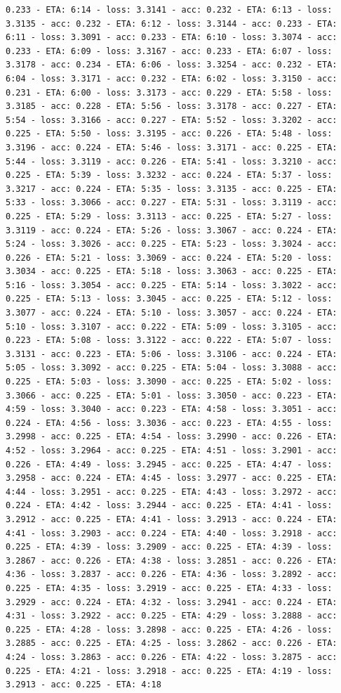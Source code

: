 \documentclass[11pt]{article}
\begin{document}
\begin{Verbatim}[commandchars=\\\{\}]
0.233 - ETA: 6:14 - loss: 3.3141 - acc: 0.232 - ETA: 6:13 - loss: 3.3135 - acc: 0.232 - ETA: 6:12 - loss: 3.3144 - acc: 0.233 - ETA: 6:11 - loss: 3.3091 - acc: 0.233 - ETA: 6:10 - loss: 3.3074 - acc: 0.233 - ETA: 6:09 - loss: 3.3167 - acc: 0.233 - ETA: 6:07 - loss: 3.3178 - acc: 0.234 - ETA: 6:06 - loss: 3.3254 - acc: 0.232 - ETA: 6:04 - loss: 3.3171 - acc: 0.232 - ETA: 6:02 - loss: 3.3150 - acc: 0.231 - ETA: 6:00 - loss: 3.3173 - acc: 0.229 - ETA: 5:58 - loss: 3.3185 - acc: 0.228 - ETA: 5:56 - loss: 3.3178 - acc: 0.227 - ETA: 5:54 - loss: 3.3166 - acc: 0.227 - ETA: 5:52 - loss: 3.3202 - acc: 0.225 - ETA: 5:50 - loss: 3.3195 - acc: 0.226 - ETA: 5:48 - loss: 3.3196 - acc: 0.224 - ETA: 5:46 - loss: 3.3171 - acc: 0.225 - ETA: 5:44 - loss: 3.3119 - acc: 0.226 - ETA: 5:41 - loss: 3.3210 - acc: 0.225 - ETA: 5:39 - loss: 3.3232 - acc: 0.224 - ETA: 5:37 - loss: 3.3217 - acc: 0.224 - ETA: 5:35 - loss: 3.3135 - acc: 0.225 - ETA: 5:33 - loss: 3.3066 - acc: 0.227 - ETA: 5:31 - loss: 3.3119 - acc: 0.225 - ETA: 5:29 - loss: 3.3113 - acc: 0.225 - ETA: 5:27 - loss: 3.3119 - acc: 0.224 - ETA: 5:26 - loss: 3.3067 - acc: 0.224 - ETA: 5:24 - loss: 3.3026 - acc: 0.225 - ETA: 5:23 - loss: 3.3024 - acc: 0.226 - ETA: 5:21 - loss: 3.3069 - acc: 0.224 - ETA: 5:20 - loss: 3.3034 - acc: 0.225 - ETA: 5:18 - loss: 3.3063 - acc: 0.225 - ETA: 5:16 - loss: 3.3054 - acc: 0.225 - ETA: 5:14 - loss: 3.3022 - acc: 0.225 - ETA: 5:13 - loss: 3.3045 - acc: 0.225 - ETA: 5:12 - loss: 3.3077 - acc: 0.224 - ETA: 5:10 - loss: 3.3057 - acc: 0.224 - ETA: 5:10 - loss: 3.3107 - acc: 0.222 - ETA: 5:09 - loss: 3.3105 - acc: 0.223 - ETA: 5:08 - loss: 3.3122 - acc: 0.222 - ETA: 5:07 - loss: 3.3131 - acc: 0.223 - ETA: 5:06 - loss: 3.3106 - acc: 0.224 - ETA: 5:05 - loss: 3.3092 - acc: 0.225 - ETA: 5:04 - loss: 3.3088 - acc: 0.225 - ETA: 5:03 - loss: 3.3090 - acc: 0.225 - ETA: 5:02 - loss: 3.3066 - acc: 0.225 - ETA: 5:01 - loss: 3.3050 - acc: 0.223 - ETA: 4:59 - loss: 3.3040 - acc: 0.223 - ETA: 4:58 - loss: 3.3051 - acc: 0.224 - ETA: 4:56 - loss: 3.3036 - acc: 0.223 - ETA: 4:55 - loss: 3.2998 - acc: 0.225 - ETA: 4:54 - loss: 3.2990 - acc: 0.226 - ETA: 4:52 - loss: 3.2964 - acc: 0.225 - ETA: 4:51 - loss: 3.2901 - acc: 0.226 - ETA: 4:49 - loss: 3.2945 - acc: 0.225 - ETA: 4:47 - loss: 3.2958 - acc: 0.224 - ETA: 4:45 - loss: 3.2977 - acc: 0.225 - ETA: 4:44 - loss: 3.2951 - acc: 0.225 - ETA: 4:43 - loss: 3.2972 - acc: 0.224 - ETA: 4:42 - loss: 3.2944 - acc: 0.225 - ETA: 4:41 - loss: 3.2912 - acc: 0.225 - ETA: 4:41 - loss: 3.2913 - acc: 0.224 - ETA: 4:41 - loss: 3.2903 - acc: 0.224 - ETA: 4:40 - loss: 3.2918 - acc: 0.225 - ETA: 4:39 - loss: 3.2909 - acc: 0.225 - ETA: 4:39 - loss: 3.2867 - acc: 0.226 - ETA: 4:38 - loss: 3.2851 - acc: 0.226 - ETA: 4:36 - loss: 3.2837 - acc: 0.226 - ETA: 4:36 - loss: 3.2892 - acc: 0.225 - ETA: 4:35 - loss: 3.2919 - acc: 0.225 - ETA: 4:33 - loss: 3.2929 - acc: 0.224 - ETA: 4:32 - loss: 3.2941 - acc: 0.224 - ETA: 4:31 - loss: 3.2922 - acc: 0.225 - ETA: 4:29 - loss: 3.2888 - acc: 0.225 - ETA: 4:28 - loss: 3.2898 - acc: 0.225 - ETA: 4:26 - loss: 3.2885 - acc: 0.225 - ETA: 4:25 - loss: 3.2862 - acc: 0.226 - ETA: 4:24 - loss: 3.2863 - acc: 0.226 - ETA: 4:22 - loss: 3.2875 - acc: 0.225 - ETA: 4:21 - loss: 3.2918 - acc: 0.225 - ETA: 4:19 - loss: 3.2913 - acc: 0.225 - ETA: 4:18 
\end{Verbatim}
\end{document}
